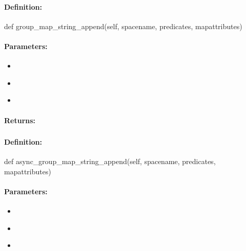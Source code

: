\paragraph{Definition:}
\begin{pythoncode}
def group_map_string_append(self, spacename, predicates, mapattributes)
\end{pythoncode}

\paragraph{Parameters:}
\begin{itemize}[noitemsep]
\item {}\\

\item {}\\

\item {}\\

\end{itemize}

\paragraph{Returns:}


\pagebreak
\subsubsection{}
\label{api:python:async_group_map_string_append}


\paragraph{Definition:}
\begin{pythoncode}
def async_group_map_string_append(self, spacename, predicates, mapattributes)
\end{pythoncode}

\paragraph{Parameters:}
\begin{itemize}[noitemsep]
\item {}\\

\item {}\\

\item {}\\

\end{itemize}

